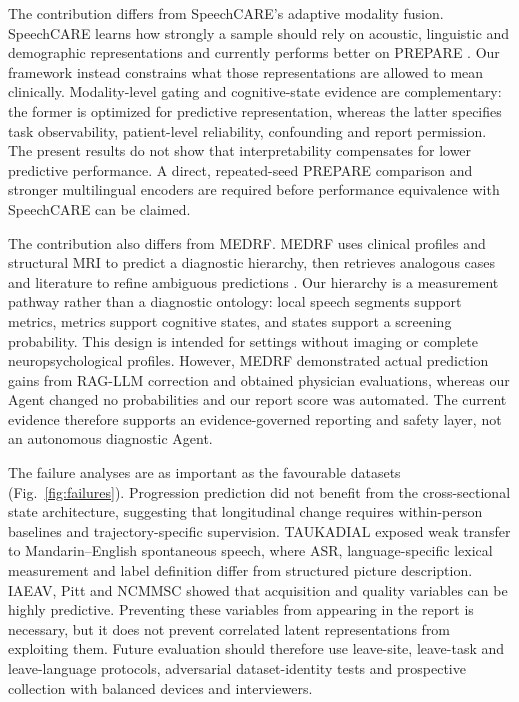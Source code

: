 \documentclass[pdflatex,sn-nature]{sn-jnl}
\begin{document}
The contribution differs from SpeechCARE's adaptive modality fusion. SpeechCARE learns how strongly a sample should rely on acoustic, linguistic and demographic representations and currently performs better on PREPARE \cite{Azadmaleki2025}. Our framework instead constrains what those representations are allowed to mean clinically. Modality-level gating and cognitive-state evidence are complementary: the former is optimized for predictive representation, whereas the latter specifies task observability, patient-level reliability, confounding and report permission. The present results do not show that interpretability compensates for lower predictive performance. A direct, repeated-seed PREPARE comparison and stronger multilingual encoders are required before performance equivalence with SpeechCARE can be claimed.

The contribution also differs from MEDRF. MEDRF uses clinical profiles and structural MRI to predict a diagnostic hierarchy, then retrieves analogous cases and literature to refine ambiguous predictions \cite{Hu2026}. Our hierarchy is a measurement pathway rather than a diagnostic ontology: local speech segments support metrics, metrics support cognitive states, and states support a screening probability. This design is intended for settings without imaging or complete neuropsychological profiles. However, MEDRF demonstrated actual prediction gains from RAG-LLM correction and obtained physician evaluations, whereas our Agent changed no probabilities and our report score was automated. The current evidence therefore supports an evidence-governed reporting and safety layer, not an autonomous diagnostic Agent.

The failure analyses are as important as the favourable datasets (Fig.~\ref{fig:failures}). Progression prediction did not benefit from the cross-sectional state architecture, suggesting that longitudinal change requires within-person baselines and trajectory-specific supervision. TAUKADIAL exposed weak transfer to Mandarin--English spontaneous speech, where ASR, language-specific lexical measurement and label definition differ from structured picture description. IAEAV, Pitt and NCMMSC showed that acquisition and quality variables can be highly predictive. Preventing these variables from appearing in the report is necessary, but it does not prevent correlated latent representations from exploiting them. Future evaluation should therefore use leave-site, leave-task and leave-language protocols, adversarial dataset-identity tests and prospective collection with balanced devices and interviewers.
\end{document}
